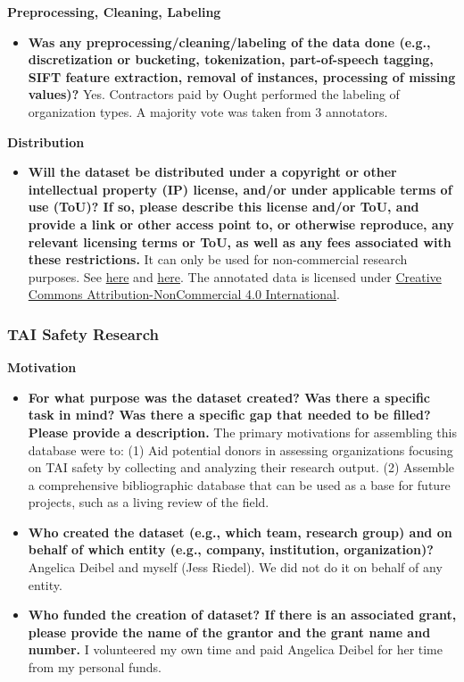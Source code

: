 \documentclass{article}
\begin{document}
\textbf{Preprocessing, Cleaning, Labeling}

\begin{itemize}
    \item \textbf{Was any preprocessing/cleaning/labeling of the data done (e.g., discretization or bucketing, tokenization, part-of-speech tagging, SIFT feature extraction, removal of instances, processing of missing values)?} Yes. Contractors paid by Ought performed the labeling of organization types. A majority vote was taken from 3 annotators.
\end{itemize}

\textbf{Distribution}

\begin{itemize}
    \item \textbf{Will the dataset be distributed under a copyright or other intellectual property (IP) license, and/or under applicable terms of use (ToU)? If so, please describe this license and/or ToU, and provide a link or other access point to, or otherwise reproduce, any relevant licensing terms or ToU, as well as any fees associated with these restrictions.} It can only be used for non-commercial research purposes. See \href{https://developer.ieee.org/docs/read/API_Use_Cases_Examples}{here} and \href{https://developer.ieee.org/docs/read/IEEE_Xplore_Metadata_API_Overview}{here}. The annotated data is licensed under \href{https://creativecommons.org/licenses/by-nc/4.0/legalcode}{Creative Commons Attribution-NonCommercial 4.0 International}. 
\end{itemize}

\subsubsection{TAI Safety Research}

\textbf{Motivation}

\begin{itemize}
    \item \textbf{For what purpose was the dataset created? Was there a specific task in mind? Was there a specific gap that needed to be filled? Please provide a description.} The primary motivations for assembling this database were to: (1) Aid potential donors in assessing organizations focusing on TAI safety by collecting and analyzing their research output. (2) Assemble a comprehensive bibliographic database that can be used as a base for future projects, such as a living review of the field.
    \item \textbf{Who created the dataset (e.g., which team, research group) and on behalf of which entity (e.g., company, institution, organization)?} Angelica Deibel and myself (Jess Riedel).  We did not do it on behalf of any entity.
    \item \textbf{Who funded the creation of dataset? If there is an associated grant, please provide the name of the grantor and the grant name and number.} I volunteered my own time and paid Angelica Deibel for her time from my personal funds.
\end{itemize}
\end{document}
